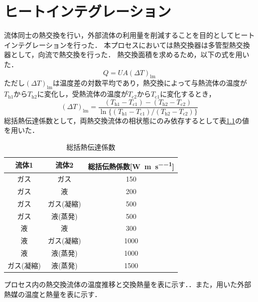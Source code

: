 \documentclass[a4j]{jsreport}
\begin{document}
\newpage
\chapter{ヒートインテグレーション}
流体同士の熱交換を行い，外部流体の利用量を削減することを目的としてヒートインテグレーションを行った．
本プロセスにおいては熱交換器は多管型熱交換器として，向流で熱交換を行った．
熱交換面積を求めるため，以下の式を用いた．
\begin{equation}
    Q=UA(\varDelta T)_\mathrm{lm}
\end{equation}
ただし$(\varDelta T)_\mathrm{lm}$は温度差の対数平均であり，熱交換によって与熱流体の温度が$T_\mathrm{h1}$から$T_\mathrm{h2}$に変化し，受熱流体の温度が$T_\mathrm{c2}$から$T_\mathrm{c1}$に変化するとき，
\begin{equation}
    (\varDelta T)_\mathrm{lm} = \frac{(T_\mathrm{h1} - T_\mathrm{c1}) - (T_\mathrm{h2} - T_\mathrm{c2})}{\ln\{(T_\mathrm{h1} - T_\mathrm{c1}) / (T_\mathrm{h2} - T_\mathrm{c2})\}}
\end{equation}
総括熱伝達係数として，両熱交換流体の相状態にのみ依存するとして表\ref{総括熱伝達係数}の値を用いた．
\begin{table}[htbp]
  \centering
  \caption{総括熱伝達係数}
  \label{総括熱伝達係数}
  \begin{tabular}{ccc}
    \hline
    流体1 & 流体2 & 総括伝熱係数[\si{\watt \per \metre \per \second}] \\
    \hline
    ガス & ガス &150 \\
    ガス & 液 &200 \\
    ガス & ガス(凝縮) & 500 \\
    ガス & 液(蒸発) & 500 \\
    液 & 液 & 300 \\
    液 & ガス(凝縮) & 1000 \\
    液 & 液(蒸発) & 1000 \\
    ガス(凝縮) & 液(蒸発) &1500 \\
    \hline
  \end{tabular}
\end{table}
プロセス内の熱交換流体の温度推移と交換熱量を表に示す．．また，用いた外部熱媒の温度と熱量を表に示す．
\end{document}
